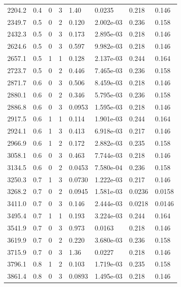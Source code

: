 \documentclass[preview]{standalone}
\begin{document}
{{{\begin{tabular}{L{1.2cm}C{1.2cm} C{0.3cm}C{0.5cm} C{1.4cm}C{1.4cm} C{1.4cm}C{1.4cm}}
  2204.2  &   0.4  & 0     &  3 &  1.40  & 0.0235  & 0.218 &  0.146   \\ 
  2349.7  &   0.5  & 0     &  2 &  0.120  & 2.002e-03  & 0.236 &  0.158   \\ 
  2432.3  &   0.5  & 0     &  3 &  0.173  & 2.895e-03  & 0.218 &  0.146   \\ 
  2624.6  &   0.5  & 0     &  3 &  0.597  & 9.982e-03  & 0.218 &  0.146   \\ 
  2657.1  &   0.5  & 1     &  1 &  0.128  & 2.137e-03  & 0.244 &  0.164   \\ 
  2723.7  &   0.5  & 0     &  2 &  0.446  & 7.465e-03  & 0.236 &  0.158   \\ 
  2871.7  &   0.6  & 0     &  3 &  0.506  & 8.459e-03  & 0.218 &  0.146   \\ 
  2880.1  &   0.6  & 0     &  2 &  0.346  & 5.795e-03  & 0.236 &  0.158   \\ 
  2886.8  &   0.6  & 0     &  3 &  0.0953  & 1.595e-03  & 0.218 &  0.146   \\ 
  2917.5  &   0.6  & 1     &  1 &  0.114  & 1.901e-03  & 0.244 &  0.164   \\ 
  2924.1  &   0.6  & 1     &  3 &  0.413  & 6.918e-03  & 0.217 &  0.146   \\ 
  2966.9  &   0.6  & 1     &  2 &  0.172  & 2.882e-03  & 0.235 &  0.158   \\ 
  3058.1  &   0.6  & 0     &  3 &  0.463  & 7.744e-03  & 0.218 &  0.146   \\ 
  3134.5  &   0.6  & 0     &  2 &  0.0453  & 7.580e-04  & 0.236 &  0.158   \\ 
  3250.3  &   0.7  & 1     &  3 &  0.0730  & 1.222e-03  & 0.217 &  0.146   \\ 
  3268.2  &   0.7  & 0     &  2 &  0.0945  & 1.581e-03  & 0.0236 &  0.0158   \\ 
  3411.0  &   0.7  & 0     &  3 &  0.146  & 2.444e-03  & 0.0218 &  0.0146   \\ 
  3495.4  &   0.7  & 1     &  1 &  0.193  & 3.224e-03  & 0.244 &  0.164   \\ 
  3541.9  &   0.7  & 0     &  3 &  0.973  & 0.0163  & 0.218 &  0.146   \\ 
  3619.9  &   0.7  & 0     &  2 &  0.220  & 3.680e-03  & 0.236 &  0.158   \\ 
  3715.9  &   0.7  & 0     &  3 &  1.36  & 0.0227  & 0.218 &  0.146   \\ 
  3796.1  &   0.8  & 1     &  2 &  0.103  & 1.719e-03  & 0.235 &  0.158   \\ 
  3861.4  &   0.8  & 0     &  3 &  0.0893  & 1.495e-03  & 0.218 &  0.146   \\ 

\end{tabular}}}}
\end{document}
